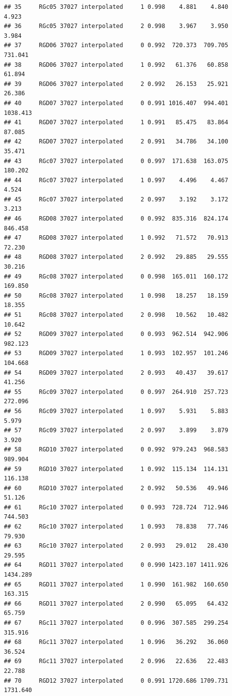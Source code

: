 \documentclass[]{article}
\begin{document}
\begin{verbatim}
## 35     RGc05 37027 interpolated     1 0.998    4.881    4.840    4.923
## 36     RGc05 37027 interpolated     2 0.998    3.967    3.950    3.984
## 37     RGD06 37027 interpolated     0 0.992  720.373  709.705  731.041
## 38     RGD06 37027 interpolated     1 0.992   61.376   60.858   61.894
## 39     RGD06 37027 interpolated     2 0.992   26.153   25.921   26.386
## 40     RGD07 37027 interpolated     0 0.991 1016.407  994.401 1038.413
## 41     RGD07 37027 interpolated     1 0.991   85.475   83.864   87.085
## 42     RGD07 37027 interpolated     2 0.991   34.786   34.100   35.471
## 43     RGc07 37027 interpolated     0 0.997  171.638  163.075  180.202
## 44     RGc07 37027 interpolated     1 0.997    4.496    4.467    4.524
## 45     RGc07 37027 interpolated     2 0.997    3.192    3.172    3.213
## 46     RGD08 37027 interpolated     0 0.992  835.316  824.174  846.458
## 47     RGD08 37027 interpolated     1 0.992   71.572   70.913   72.230
## 48     RGD08 37027 interpolated     2 0.992   29.885   29.555   30.216
## 49     RGc08 37027 interpolated     0 0.998  165.011  160.172  169.850
## 50     RGc08 37027 interpolated     1 0.998   18.257   18.159   18.355
## 51     RGc08 37027 interpolated     2 0.998   10.562   10.482   10.642
## 52     RGD09 37027 interpolated     0 0.993  962.514  942.906  982.123
## 53     RGD09 37027 interpolated     1 0.993  102.957  101.246  104.668
## 54     RGD09 37027 interpolated     2 0.993   40.437   39.617   41.256
## 55     RGc09 37027 interpolated     0 0.997  264.910  257.723  272.096
## 56     RGc09 37027 interpolated     1 0.997    5.931    5.883    5.979
## 57     RGc09 37027 interpolated     2 0.997    3.899    3.879    3.920
## 58     RGD10 37027 interpolated     0 0.992  979.243  968.583  989.904
## 59     RGD10 37027 interpolated     1 0.992  115.134  114.131  116.138
## 60     RGD10 37027 interpolated     2 0.992   50.536   49.946   51.126
## 61     RGc10 37027 interpolated     0 0.993  728.724  712.946  744.503
## 62     RGc10 37027 interpolated     1 0.993   78.838   77.746   79.930
## 63     RGc10 37027 interpolated     2 0.993   29.012   28.430   29.595
## 64     RGD11 37027 interpolated     0 0.990 1423.107 1411.926 1434.289
## 65     RGD11 37027 interpolated     1 0.990  161.982  160.650  163.315
## 66     RGD11 37027 interpolated     2 0.990   65.095   64.432   65.759
## 67     RGc11 37027 interpolated     0 0.996  307.585  299.254  315.916
## 68     RGc11 37027 interpolated     1 0.996   36.292   36.060   36.524
## 69     RGc11 37027 interpolated     2 0.996   22.636   22.483   22.788
## 70     RGD12 37027 interpolated     0 0.991 1720.686 1709.731 1731.640

\end{verbatim}
\end{document}
